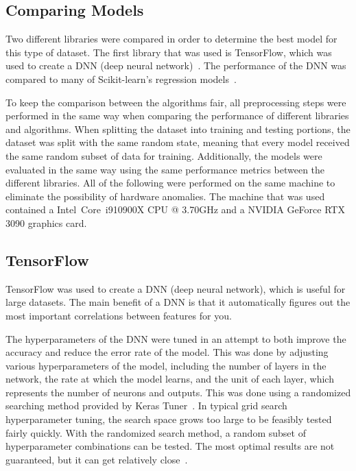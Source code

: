 \documentclass[lettersize,journal]{IEEEtran}
\begin{document}
\subsection{Comparing Models}
Two different libraries were compared in order to determine the best model for this type of dataset. The first library that was used is TensorFlow, which was used to create a DNN (deep neural network)~\cite{tensorflow2015-whitepaper}. The performance of the DNN was compared to many of Scikit-learn's regression models~\cite{scikit-learn}.

To keep the comparison between the algorithms fair, all preprocessing steps were performed in the same way when comparing the performance of different libraries and algorithms. When splitting the dataset into training and testing portions, the dataset was split with the same random state, meaning that every model received the same random subset of data for training. Additionally, the models were evaluated in the same way using the same performance metrics between the different libraries. All of the following were performed on the same machine to eliminate the possibility of hardware anomalies. The machine that was used contained a  Intel\textregistered~Core\texttrademark~i9\-10900X CPU @ 3.70GHz and a NVIDIA GeForce RTX 3090 graphics card. 


\subsection{TensorFlow}
TensorFlow was used to create a DNN (deep neural network), which is useful for large datasets. The main benefit of a DNN is that it automatically figures out the most important correlations between features for you. 

The hyperparameters of the DNN were tuned in an attempt to both improve the accuracy and reduce the error rate of the model. This was done by adjusting various hyperparameters of the model, including the number of layers in the network, the rate at which the model learns, and the unit of each layer, which represents the number of neurons and outputs. This was done using a randomized searching method provided by Keras Tuner~\cite{omalley2019kerastuner}. In typical grid search hyperparameter tuning, the search space grows too large to be feasibly tested fairly quickly. With the randomized search method, a random subset of hyperparameter combinations can be tested. The most optimal results are not guaranteed, but it can get relatively close~\cite{meanti_efficient_2022}. 
\end{document}
